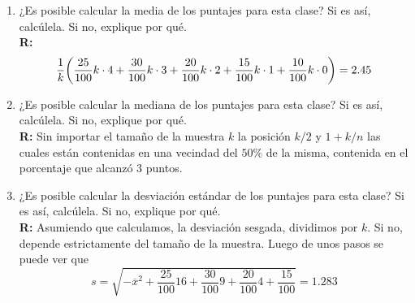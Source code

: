 \documentclass[10pt,a4paper]{book}
\begin{document}
\begin{enumerate}
	\begin{enumerate}
		\item ¿Es posible calcular la media de los puntajes para esta clase? Si es así, calcúlela. Si no, explique por qué.\\
		\textbf{R:} $$ \frac{1}{k}\bigg{(}\frac{25}{100}k\cdot4 + \frac{30}{100}k\cdot3 + \frac{20}{100}k\cdot2 + \frac{15}{100}k\cdot1 + \frac{10}{100}k\cdot0 \bigg{)} = 2.45$$
		
		\item ¿Es posible calcular la mediana de los puntajes para esta clase? Si es así, calcúlela. Si no, explique por qué.\\
		\textbf{R:} Sin importar el tamaño de la muestra $ k $ la posición $ k/2 $ y $ 1+ k/n $ las cuales están contenidas en una vecindad del $ 50\% $ de la misma, contenida en el porcentaje que alcanzó $ 3 $ puntos.
		
		\item ¿Es posible calcular la desviación estándar de los puntajes para esta clase? Si es así, calcúlela. Si no, explique por qué.\\
		\textbf{R:} Asumiendo que calculamos, la desviación sesgada, dividimos por $k$. Si no, depende estrictamente del tamaño de la muestra. Luego de unos pasos se puede ver que
		$$s = \sqrt{-\overline{x}^2 + \frac{25}{100}16 +\frac{30}{100}9 +\frac{20}{100}4 + \frac{15}{100} } = 1.283 $$
	\end{enumerate}
\end{enumerate}
\end{document}

